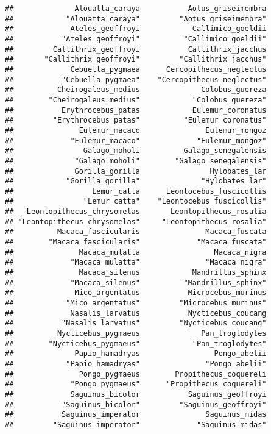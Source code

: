 \documentclass[
]{article}
\begin{document}
\begin{verbatim}
##              Alouatta_caraya           Aotus_griseimembra 
##            "Alouatta_caraya"         "Aotus_griseimembra" 
##             Ateles_geoffroyi            Callimico_goeldii 
##           "Ateles_geoffroyi"          "Callimico_goeldii" 
##         Callithrix_geoffroyi           Callithrix_jacchus 
##       "Callithrix_geoffroyi"         "Callithrix_jacchus" 
##             Cebuella_pygmaea      Cercopithecus_neglectus 
##           "Cebuella_pygmaea"    "Cercopithecus_neglectus" 
##          Cheirogaleus_medius              Colobus_guereza 
##        "Cheirogaleus_medius"            "Colobus_guereza" 
##           Erythrocebus_patas            Eulemur_coronatus 
##         "Erythrocebus_patas"          "Eulemur_coronatus" 
##               Eulemur_macaco               Eulemur_mongoz 
##             "Eulemur_macaco"             "Eulemur_mongoz" 
##                Galago_moholi          Galago_senegalensis 
##              "Galago_moholi"        "Galago_senegalensis" 
##              Gorilla_gorilla                Hylobates_lar 
##            "Gorilla_gorilla"              "Hylobates_lar" 
##                  Lemur_catta      Leontocebus_fuscicollis 
##                "Lemur_catta"    "Leontocebus_fuscicollis" 
##   Leontopithecus_chrysomelas       Leontopithecus_rosalia 
## "Leontopithecus_chrysomelas"     "Leontopithecus_rosalia" 
##          Macaca_fascicularis               Macaca_fuscata 
##        "Macaca_fascicularis"             "Macaca_fuscata" 
##               Macaca_mulatta                 Macaca_nigra 
##             "Macaca_mulatta"               "Macaca_nigra" 
##               Macaca_silenus            Mandrillus_sphinx 
##             "Macaca_silenus"          "Mandrillus_sphinx" 
##              Mico_argentatus           Microcebus_murinus 
##            "Mico_argentatus"         "Microcebus_murinus" 
##             Nasalis_larvatus           Nycticebus_coucang 
##           "Nasalis_larvatus"         "Nycticebus_coucang" 
##          Nycticebus_pygmaeus              Pan_troglodytes 
##        "Nycticebus_pygmaeus"            "Pan_troglodytes" 
##              Papio_hamadryas                 Pongo_abelii 
##            "Papio_hamadryas"               "Pongo_abelii" 
##               Pongo_pygmaeus        Propithecus_coquereli 
##             "Pongo_pygmaeus"      "Propithecus_coquereli" 
##             Saguinus_bicolor           Saguinus_geoffroyi 
##           "Saguinus_bicolor"         "Saguinus_geoffroyi" 
##           Saguinus_imperator               Saguinus_midas 
##         "Saguinus_imperator"             "Saguinus_midas" 

\end{verbatim}
\end{document}
